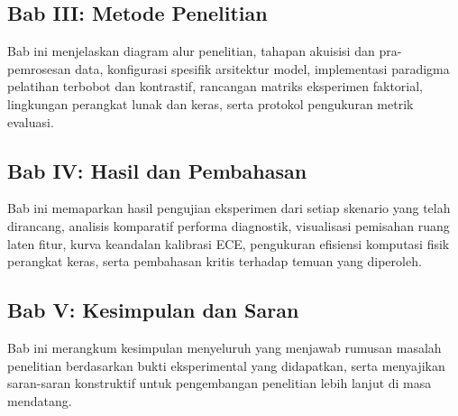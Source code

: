 \subsection*{Bab III: Metode Penelitian}
Bab ini menjelaskan diagram alur penelitian, tahapan akuisisi dan pra-pemrosesan data, konfigurasi spesifik arsitektur model, implementasi paradigma pelatihan terbobot dan kontrastif, rancangan matriks eksperimen faktorial, lingkungan perangkat lunak dan keras, serta protokol pengukuran metrik evaluasi. \par

\subsection*{Bab IV: Hasil dan Pembahasan}
Bab ini memaparkan hasil pengujian eksperimen dari setiap skenario yang telah dirancang, analisis komparatif performa diagnostik, visualisasi pemisahan ruang laten fitur, kurva keandalan kalibrasi ECE, pengukuran efisiensi komputasi fisik perangkat keras, serta pembahasan kritis terhadap temuan yang diperoleh. \par

\subsection*{Bab V: Kesimpulan dan Saran}
Bab ini merangkum kesimpulan menyeluruh yang menjawab rumusan masalah penelitian berdasarkan bukti eksperimental yang didapatkan, serta menyajikan saran-saran konstruktif untuk pengembangan penelitian lebih lanjut di masa mendatang.

